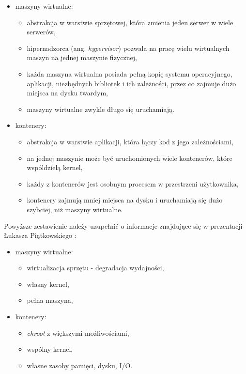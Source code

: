 \documentclass[mgr,oneside]{mgr}
\begin{document}
\begin{itemize}
  \item maszyny wirtualne:
  \begin{itemize}
    \item abstrakcja w warstwie sprzętowej, która zmienia jeden serwer w wiele serwerów,
    \item hipernadzorca (ang. \textit{hypervisor}) pozwala na pracę wielu wirtualnych maszyn na jednej maszynie fizycznej,
    \item każda maszyna wirtualna posiada pełną kopię systemu operacyjnego, aplikacji, niezbędnych bibliotek i ich zależności, przez co zajmuje dużo miejsca na dysku twardym,
    \item maszyny wirtualne zwykle długo się uruchamiają.
  \end{itemize}

  \item kontenery:
  \begin{itemize}
    \item abstrakcja w warstwie aplikacji, która łączy kod z jego zależnościami,
    \item na jednej maszynie może być uruchomionych wiele kontenerów, które wspóldzielą kernel,
    \item każdy z kontenerów jest osobnym procesem w przestrzeni użytkownika,
    \item kontenery zajmują mniej miejsca na dysku i uruchamiają się dużo szybciej, niż maszyny wirtualne.
  \end{itemize}
\end{itemize}

Powyższe zestawienie należy uzupełnić o informacje znajdujące się w prezentacji Łukasza Piątkowskiego \cite{docker_prez}:
\begin{itemize}
  \item maszyny wirtualne:
  \begin{itemize}
    \item wirtualizacja sprzętu - degradacja wydajności,
    \item własny kernel,
    \item pełna maszyna,
  \end{itemize}

  \item kontenery:
  \begin{itemize}
    \item \textit{chroot} z większymi możliwościami,
    \item wspólny kernel,
    \item własne zasoby pamięci, dysku, I/O.
  \end{itemize}
\end{itemize}
\end{document}
